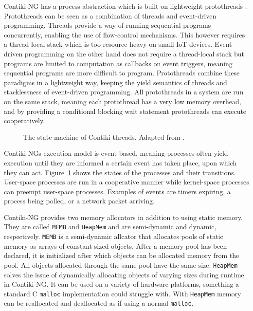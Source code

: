 \documentclass[0-thesis.tex]{subfiles}
\begin{document}
Contiki-NG has a process abstraction which is built on lightweight protothreads
\parencite{protothreads}. Protothreads can be seen as a combination of threads and
event-driven programming. Threads provide a way of running sequential programs
concurrently, enabling the use of flow-control mechanisms. This however requires a
thread-local stack which is too resource heavy on small IoT devices. Event-driven
programming on the other hand does not require a thread-local stack but programs are
limited to computation as callbacks on event triggers, meaning sequential programs are
more difficult to program. Protothreads combine these paradigms in a lightweight way,
keeping the yield semantics of threads and stacklessness of event-driven programming. All
protothreads in a system are run on the same stack, meaning each protothread has a very
low memory overhead, and by providing a conditional blocking wait statement protothreads
can execute cooperatively.

\begin{figure}
    \caption{The state machine of Contiki threads. Adapted from \parencite{contiki-multithreading}.}
    \label{fig:state-machine}
\end{figure}

Contiki-NGs execution model is event based, meaning processes often yield execution until
they are informed a certain event has taken place, upon which they can act.
Figure~\ref{fig:state-machine} shows the states of the processes and their transitions.
User-space processes are run in a cooperative manner while kernel-space processes can
preempt user-space processes. Examples of events are timers expiring, a process being
polled, or a network packet arriving.

Contiki-NG provides two memory allocators in addition to using static memory. They are
called \texttt{MEMB} and \texttt{HeapMem} and are semi-dynamic and dynamic, respectively.
\texttt{MEMB} is a semi-dynamic allcator that allocates pools of static memory as arrays
of constant sized objects. After a memory pool has been declared, it is initialized after
which objects can be allocated memory from the pool. All objects allocated through the
same pool have the same size. \texttt{HeapMem} solves the issue of dynamically allocating
objects of varying sizes during runtime in Contiki-NG. It can be used on a variety of
hardware platforms, something a standard C \texttt{malloc} implementation could struggle
with. With \texttt{HeapMem} memory can be reallocated and deallocated as if using a normal
\texttt{malloc}.
\end{document}
